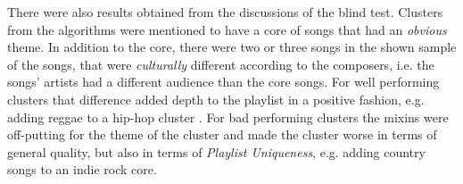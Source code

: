 \documentclass[../report.tex]{subfiles}
\begin{document}
There were also results obtained from the discussions of the blind test. Clusters from the algorithms were mentioned to have a core of songs that had an \textit{obvious} theme. In addition to the core, there were two or three songs in the shown sample of the songs, that were \textit{culturally} different according to the composers, i.e. the songs' artists had a different audience than the core songs. For well performing clusters that difference added depth to the playlist in a positive fashion, e.g. adding reggae to a hip-hop cluster . For bad performing clusters the mixins were off-putting for the theme of the cluster and made the cluster worse in terms of general quality, but also in terms of \textit{Playlist Uniqueness}, e.g. adding country songs to an indie rock core.

\begin{table}[H]
\caption{Mean rating and standard deviation (in brackets) of five clusters given source type}
\label{table:rating}
\end{table}
\end{document}
